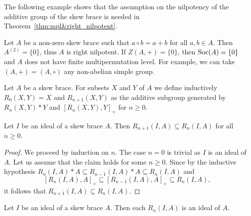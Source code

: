 The following example shows that the assumption on the nilpotency of
the additive group of the skew  brace is needed in 
Theorem~\ref{thm:mpl&right_nilpotent}.

\begin{example}
\label{ex:trivial}
Let $A$ be a non-zero skew brace such that $a\circ b=a+b$ for
all $a,b\in A$. Then $A^{(2)}=\{0\}$, thus $A$ is right nilpotent. 
If $Z(A,+)=\{0\}$, then $\operatorname{Soc}(A)=\{0\}$ and $A$ does not have finite
multipermutation level. For example, we can take $(A,+)=(A,\circ)$
any non-abelian simple group.
\end{example}

Let $A$ be a skew brace. For subsets $X$ and $Y$ of $A$ we define 
inductively $R_0(X,Y)=X$ and $R_{n+1}(X,Y)$ as the additive subgroup generated by
$R_n(X,Y)*Y$ and $[R_n(X,Y),Y]_+$ for $n\geq0$.

\begin{lemma}
    \label{lem:R:inclusion}
    Let $I$ be an ideal of a skew brace $A$. Then
    $R_{n+1}(I,A)\subseteq R_n(I,A)$ for all $n\geq0$.
\end{lemma}

\begin{proof}
    We proceed by induction on $n$. The case $n=0$ is trivial as $I$ is an ideal of $A$. 
    Let us assume that the claim holds for some $n\geq0$. Since by the inductive hypothesis
    $R_n(I,A)*A\subseteq R_{n-1}(I,A)*A\subseteq R_{n}(I,A)$ and 
    \[
    [R_n(I,A),A]_+\subseteq [R_{n-1}(I,A),A]_+ \subseteq R_n(I,A),
    \]
    it follows that $R_{n+1}(I,A)\subseteq R_n(I,A)$.
\end{proof}

\begin{proposition}
    \label{lem:R:ideal}
    Let $I$ be an ideal of a skew brace $A$. 
    Then each $R_{n}(I,A)$ is an ideal of $A$. 
\end{proposition}

